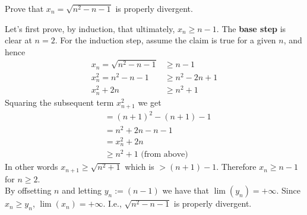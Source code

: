 \documentclass[boxes, qed]{homework}
\begin{document}
\begin{problem}Prove that $x_n=\sqrt{n^2-n-1}$ is properly divergent.
\end{problem}
\begin{solution}Let's first prove, by induction, that ultimately,
  $x_n\ge{n-1}$. The \textbf{base step} is clear at $n=2$. For the induction
  step, assume the claim is true for a given $n$, and hence
  \begin{align*}
    x_n = \sqrt{n^2-n-1} &\ge n-1\\
    x_n^2 = n^2-n-1 &\ge n^2-2n+1\\
    x_n^2 + 2n &\ge n^2+1
  \end{align*}
  Squaring the subsequent term $x_{n+1}^2$ we get
  \begin{align*}
    &= (n+1)^2 -(n+1) -1\\
    &= n^2+2n-n-1\\
    &= x_n^2+2n\\
    &\ge n^2+1 \text{ (from above)}
  \end{align*}
  In other words $x_{n+1}\ge\sqrt{n^2+1}$
  which is $>(n+1)-1$. Therefore $x_n\ge{n-1}$ for $n\ge2$.\\

  By offsetting $n$ and letting $y_n:=(n-1)$ we have that $\lim(y_n)=+\infty$.
  Since $x_n\ge{y_n}$, $\lim(x_n)=+\infty$. I.e., $\sqrt{n^2-n-1}$ is properly
  divergent.
\end{solution}
\end{document}
